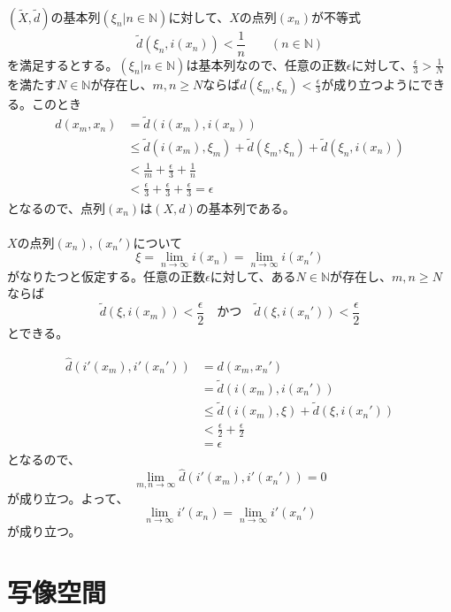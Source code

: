 \documentclass{jsarticle}
\begin{document}
\subsection{}
$(\tilde{X},\tilde{d})$の基本列$(\xi_n|n\in\mathbb{N})$に対して、$X$の点列$(x_n)$が不等式
\[\tilde{d}(\xi_n,i(x_n))<\frac{1}{n}\qquad (n\in\mathbb{N})\]
を満足するとする。$(\xi_n|n\in\mathbb{N})$は基本列なので、任意の正数$\epsilon$に対して、$\frac{\epsilon}{3}>\frac{1}{N}$を満たす$N\in\mathbb{N}$が存在し、$m,n\geq N$ならば$d(\xi_m,\xi_n)<\frac{\epsilon}{3}$が成り立つようにできる。このとき
\begin{align*}
d(x_m,x_n)&=\tilde{d}(i(x_m),i(x_n))\\
&\leq \tilde{d}(i(x_m),\xi_m)+\tilde{d}(\xi_m,\xi_n)+\tilde{d}(\xi_n,i(x_n))\\
&< \frac{1}{m}+\frac{\epsilon}{3}+\frac{1}{n}\\
&< \frac{\epsilon}{3}+\frac{\epsilon}{3}+\frac{\epsilon}{3}=\epsilon
\end{align*}
となるので、点列$(x_n)$は$(X,d)$の基本列である。



\subsection{}
$X$の点列$(x_n),(x_n')$について
\[\xi=\lim_{n\to\infty}i(x_n)=\lim_{n\to\infty}i(x_n')\]
がなりたつと仮定する。任意の正数$\epsilon$に対して、ある$N\in\mathbb{N}$が存在し、$m,n\geq N$ならば
\[\tilde{d}(\xi,i(x_m))<\frac{\epsilon}{2} \quad かつ \quad \tilde{d}(\xi,i(x_n'))<\frac{\epsilon}{2}\]
とできる。

\begin{align*}
\hat{d}(i'(x_m),i'(x_n'))&=d(x_m,x_n')\\
&=\tilde{d}(i(x_m),i(x_n'))\\
&\leq \tilde{d}(i(x_m),\xi)+\tilde{d}(\xi,i(x_n'))\\
&<\frac{\epsilon}{2}+\frac{\epsilon}{2}\\
&=\epsilon
\end{align*}
となるので、
\[\lim_{m,n\to\infty}\hat{d}(i'(x_m),i'(x_n'))=0\]
が成り立つ。よって、
\[\lim_{n\to\infty}i'(x_n)=\lim_{n\to\infty}i'(x_n')\]
が成り立つ。







\part{写像空間}
\end{document}
